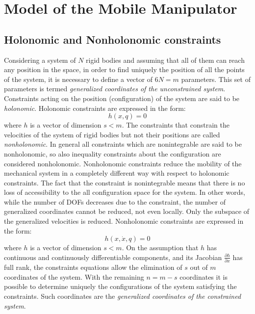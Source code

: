 \chapter{Model of the Mobile Manipulator}
\label{chapter2}

\section{Holonomic and Nonholonomic constraints}
Considering a system of $N$ rigid bodies and assuming that all of them can reach any position in the space, in order to find uniquely the position of all the points of the system, it is necessary to define a vector of $6N = m$ parameters. This set of parameters is termed \textit{ generalized coordinates of the unconstrained system}. 
Constraints acting on the position (configuration) of the system are said to be  \textit{holonomic}. 
Holonomic constraints are expressed in the form:
\begin{equation}
h\left( x,q \right) =0
\end{equation}
where $h$ is a vector of dimension $s<m$.
The constraints that constrain the velocities of the system of rigid bodies but not their positions are called \textit{nonholonomic}. In general all constraints which are nonintegrable are said to be nonholonomic, so also inequality constraints about the configuration are considered nonholonomic. 
Nonholonomic constraints reduce the mobility of the mechanical system in a completely different way with respect to holonomic constraints. The fact that the constraint is nonintegrable means that there is no loss of accessibility to the all configuration space for the system. In other words, while the number of DOFs decreases due to the constraint, the number of generalized coordinates cannot be reduced, not even locally. Only the subspace of the generalized velocities is reduced.
Nonholonomic constraints are expressed in the form:
\begin{equation}
h( x,\dot{x},q) =0
\end{equation}
where $h$ is a vector of dimension $s<m$.
On the assumption that $h$ has continuous and continuously differentiable components, and its Jacobian $ \frac{\partial h}{\partial x} $ has full rank, the constraints equations allow the elimination of $s$ out of $m$ coordinates of the system. With the remaining $ n = m - s $ coordinates it is possible to determine uniquely the configurations of the system satisfying the constraints. Such coordinates are the \textit{generalized coordinates of the constrained system}.\\
